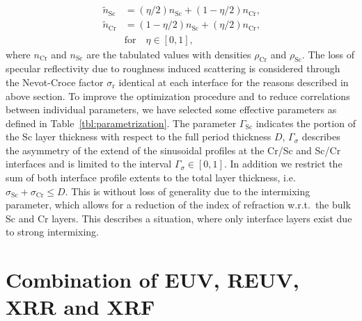 \documentclass{iucr}              %
\begin{document}
\begin{align}
\tilde{n}_\text{Sc} &=(\eta/2) n_\text{Sc} + (1-\eta/2) n_\text{Cr} \text{,} \nonumber\\
\tilde{n}_\text{Cr} &=(1-\eta/2) n_\text{Sc} + (\eta/2) n_\text{Cr} \text{,} \label{eqn:effective_n} \\
&\text{for} \quad \eta \in [0,1] \text{,}\nonumber
\end{align}
where $n_\text{Cr}$ and $n_\text{Sc}$ are the tabulated values \cite{henke} with densities $\rho_\text{Cr}$ and $\rho_\text{Sc}$. The loss of specular reflectivity due to roughness induced scattering is considered through the Nevot-Croce factor $\sigma_\text{r}$ identical at each interface for the reasons described in above section. To improve the optimization procedure and to reduce correlations between individual parameters, we have selected some effective parameters as defined in Table~\ref{tbl:parametrization}. The parameter $\Gamma_\text{Sc}$ indicates the portion of the Sc layer thickness with respect to the full period thickness $D$, $\Gamma_\sigma$ describes the asymmetry of the extend of the sinusoidal profiles at the Cr/Sc and Sc/Cr interfaces and is limited to the interval $\Gamma_\sigma \in [0,1]$. In addition we restrict the sum of both interface profile extents to the total layer thickness, i.e.~$\sigma_\text{Sc} + \sigma_\text{Cr} \leq D$. This is without loss of generality due to the intermixing parameter, which allows for a reduction of the index of refraction w.r.t.~the bulk Sc and Cr layers. This describes a situation, where only interface layers exist due to strong intermixing.



\section{Combination of EUV, REUV, XRR and XRF}
\end{document}
